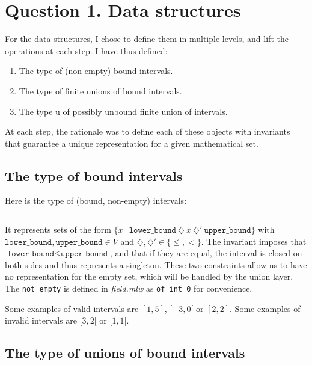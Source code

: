 \section{Question 1. Data structures}

For the data structures, I chose to define them in multiple levels, and lift the
operations at each step. I have thus defined:
%
\begin{enumerate}
  \item The type of (non-empty) bound intervals.
  \item The type of finite unions of bound intervals.
  \item The type u of possibly unbound finite union of intervals.
\end{enumerate}
%
At each step, the rationale was to define each of these objects with invariants that
guarantee a unique representation for a given mathematical set.
%

\subsection{The type of bound intervals}
Here is the type of (bound, non-empty) intervals:
\inputminted{\whyml}{why3code/interval_type.mlw}
%
It represents sets of the form
$\{ x ~|~ \texttt{lower\_bound}~\diamondsuit~x~\diamondsuit'~\texttt{upper\_bound} \}$
with
$\texttt{lower\_bound}, \texttt{upper\_bound} \in V$ and
$\diamondsuit, \diamondsuit' \in \{ \le, < \}$.
%
The invariant imposes that $\texttt{lower\_bound} \le \texttt{upper\_bound}$,
%
and that if they are equal, the interval is closed on both sides and thus represents
a singleton. These two constraints allow us to have no representation for the empty
set, which will be handled by the union layer.
%
The \texttt{not_empty} is defined in \textit{field.mlw} as
\texttt{of\_int 0} for convenience.

Some examples of valid intervals are $[1, 5]$, $[-3, 0[$ or $[2,2]$. Some
examples of invalid intervals are $[3, 2[$ or $[1,1[$.


\subsection{The type of unions of bound intervals}

